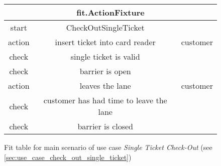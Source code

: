 \begin{figure}[H]
\begin{centering}
\begin{tabular}{|c|c|c|}
\hline 
\multicolumn{3}{|c|}{fit.ActionFixture}\tabularnewline
\hline 
start & CheckOutSingleTicket & \tabularnewline
\hline 
action & insert ticket into card reader & customer\tabularnewline
\hline 
check & single ticket is valid & \tabularnewline
\hline 
check & barrier is open & \tabularnewline
\hline 
action & leaves the lane & customer\tabularnewline
\hline 
check & customer has had time to leave the lane & \tabularnewline
\hline 
check & barrier is closed & \tabularnewline
\hline 
\end{tabular}
\caption{Fit table for main scenario of use case \emph{Single Ticket Check-Out} (see \autoref{sec:use_case_check_out_single_ticket})}
\end{centering}
\end{figure}
